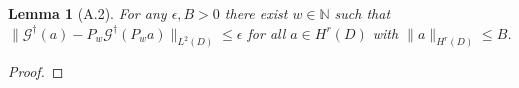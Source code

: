 \documentclass[reqno,9pt]{amsart}
\theoremstyle{plain}
\newtheorem*{lem*}{Lemma}
\theoremstyle{definition}
\newcommand{\bb}[1]{\mathbb{#1}}
\newcommand{\cal}[1]{\mathcal{#1}}
\begin{document}
    \begin{lem*}[A.2]
        For any $\epsilon, B > 0$ there exist $w \in \bb N$ such that $\|\cal G^\dag(a) - P_w\cal G^\dag(P_wa)\|_{L^2(D)} \leq \epsilon$ for all $a \in H^r(D)$ with $\|a\|_{H^r(D)} \leq B$.        
    \end{lem*}
    \begin{proof}
                
    \end{proof}




\end{document}
